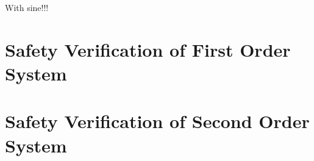 With sine!!!

\section{Safety Verification of First Order System}

\section{Safety Verification of Second Order System}